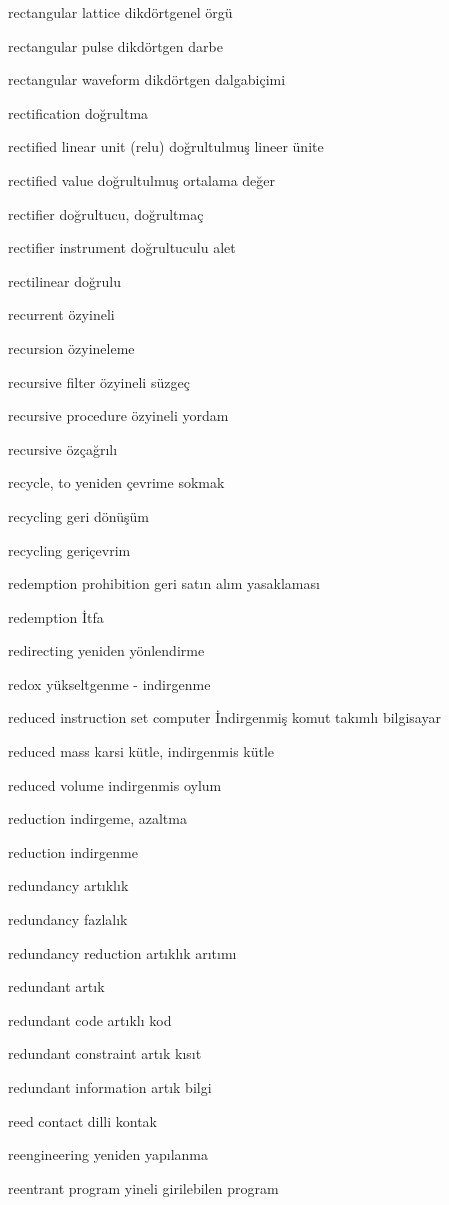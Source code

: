 \documentclass[12pt,fleqn]{article}\usepackage{../../common}
\begin{document}
rectangular lattice dikdörtgenel örgü

rectangular pulse dikdörtgen darbe

rectangular waveform dikdörtgen dalgabiçimi

rectification doğrultma

rectified linear unit (relu) doğrultulmuş lineer ünite

rectified value doğrultulmuş ortalama değer

rectifier doğrultucu, doğrultmaç

rectifier instrument doğrultuculu alet

rectilinear doğrulu

recurrent özyineli

recursion özyineleme

recursive filter özyineli süzgeç

recursive procedure özyineli yordam

recursive özçağrılı

recycle, to yeniden çevrime sokmak

recycling geri dönüşüm

recycling geriçevrim

redemption prohibition geri satın alım yasaklaması

redemption İtfa

redirecting yeniden yönlendirme

redox yükseltgenme - indirgenme

reduced instruction set computer İndirgenmiş komut takımlı bilgisayar

reduced mass karsi kütle, indirgenmis kütle

reduced volume indirgenmis oylum

reduction indirgeme, azaltma

reduction indirgenme

redundancy artıklık

redundancy fazlalık

redundancy reduction artıklık arıtımı

redundant artık

redundant code artıklı kod

redundant constraint artık kısıt

redundant information artık bilgi

reed contact dilli kontak

reengineering yeniden yapılanma

reentrant program yineli girilebilen program
\end{document}
